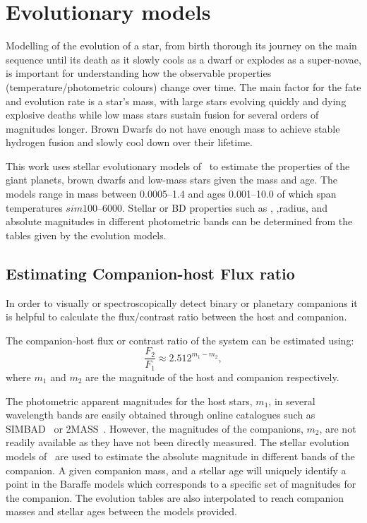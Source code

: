 
\section{Evolutionary models}
\label{sec:evolutionary_models}
Modelling of the evolution of a star, from birth thorough its journey on the main sequence until its death as it slowly cools as a dwarf or explodes as a super-novae, is important for understanding how the observable properties  (temperature/photometric colours) change over time.
The main factor for the fate and evolution rate is a star's mass, with large stars evolving quickly and dying explosive deaths while low mass stars sustain fusion for several orders of magnitudes longer.
Brown Dwarfs do not have enough mass to achieve stable hydrogen fusion and slowly cool down over their lifetime.

This work uses stellar evolutionary models of~\citet{baraffe_evolutionary_2003, baraffe_new_2015} to estimate the properties of the giant planets, brown dwarfs and low-mass stars given the mass and age.
The models range in mass between 0.0005--1.4\Msun{} and ages 0.001--10.0\Gyr{} of which span temperatures $sim100$--6000\K{}.
Stellar or {BD} properties such as \Teff{}, \Logg{},radius, and absolute magnitudes in different photometric bands can be determined from the tables given by the evolution models.

\subsection{Estimating Companion-host Flux ratio}
\label{subsec:compaion_flux_ratio}
In order to visually or spectroscopically detect binary or planetary companions it is helpful to calculate the flux/contrast ratio between the host and companion.

The companion-host flux or contrast ratio of the system can be estimated using:
\begin{equation}
\frac{F_{2}}{F_{1}} \approx 2.512^{m_{1} - m_{2}}, \label{eqn:mag_flux_ratios}
\end{equation}
where \(m_{1}\) and \(m_{2}\) are the magnitude of the host and companion respectively.

The photometric apparent magnitudes for the host stars, \(m_{1}\), in several wavelength bands are easily obtained through online catalogues such as {SIMBAD}~\citep{wenger_simbad_2000} or {2MASS}~\citep{skrutskie_two_2006}.
However, the magnitudes of the companions, \(m_{2}\), are not readily available as they have not been directly measured.
The stellar evolution models of~\citet{baraffe_evolutionary_2003, baraffe_new_2015} are used to estimate the absolute magnitude in different bands of the companion.
A given companion mass, and a stellar age will uniquely identify a point in the Baraffe models which corresponds to a specific set of magnitudes for the companion.
The evolution tables are also interpolated to reach companion masses and stellar ages between the models provided.

